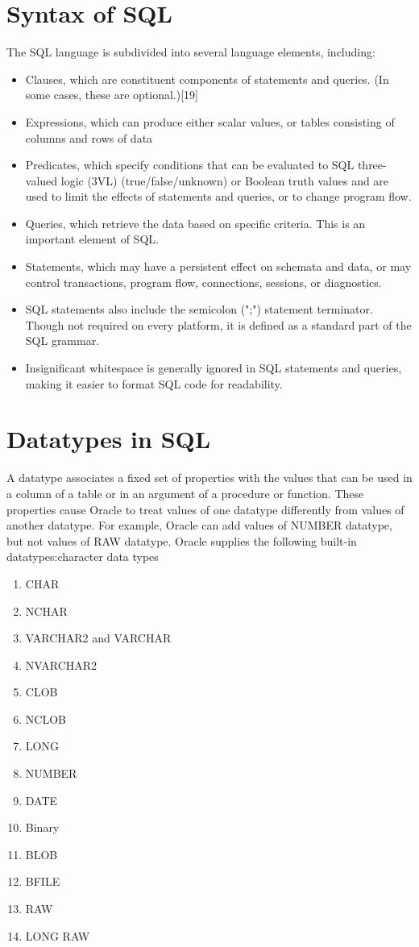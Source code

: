 \documentclass[10pt,a4paper,titlepage]{report}
\begin{document}
{\section{Syntax of SQL}

The SQL language is subdivided into several language elements, including:
\begin{itemize}
	\item Clauses, which are constituent components of statements and queries. (In some cases, these are optional.)[19]
	\item Expressions, which can produce either scalar values, or tables consisting of columns and rows of data
	\item Predicates, which specify conditions that can be evaluated to SQL three-valued logic (3VL) (true/false/unknown) or Boolean truth values and are used to limit the effects of statements and queries, or to change program flow.
	\item Queries, which retrieve the data based on specific criteria. This is an important element of SQL.
	\item Statements, which may have a persistent effect on schemata and data, or may control transactions, program flow, connections, sessions, or diagnostics.
	\item SQL statements also include the semicolon (";") statement terminator. Though not required on every platform, it is defined as a standard part of the SQL grammar.
	\item Insignificant whitespace is generally ignored in SQL statements and queries, making it easier to format SQL code for readability.
\end{itemize}

\section{Datatypes in SQL}

A datatype associates a fixed set of properties with the values that can be used in a column of a table
or in an argument of a procedure or function. These properties cause Oracle to treat values of one
datatype differently from values of another datatype. For example, Oracle can add values of
NUMBER datatype, but not values of RAW datatype.
Oracle supplies the following built-in datatypes:character data types
\begin{enumerate}
	\item CHAR
	\item NCHAR
	\item VARCHAR2 and VARCHAR
	\item NVARCHAR2
	\item CLOB
	\item NCLOB
	\item LONG
	\item NUMBER
	\item DATE
	\item Binary
	\item BLOB
	\item BFILE
	\item RAW
	\item LONG RAW
\end{enumerate}



}
\end{document}
